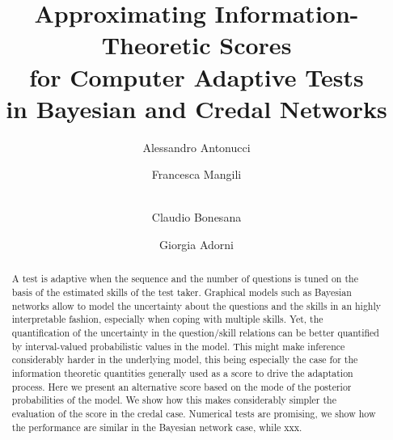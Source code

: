 \documentclass[runningheads]{llncs}
\begin{document}
\title{Approximating Information-Theoretic Scores\\for Computer Adaptive Tests\\in Bayesian and Credal Networks}
\author{Alessandro Antonucci \and
Francesca Mangili \and\\
Claudio Bonesana \and
Giorgia Adorni}
\maketitle
\begin{abstract}
A test is adaptive when the sequence and the number of questions is tuned on the basis of the estimated skills of the test taker. Graphical models such as Bayesian networks allow to model the uncertainty about the questions and the skills in an highly interpretable fashion, especially when coping with multiple skills. Yet, the quantification of the uncertainty in the question/skill relations can be better quantified by interval-valued probabilistic values in the model. This might make inference considerably harder in the underlying model, this being especially the case for the information theoretic quantities generally used as a score to drive the adaptation process.
Here we present an alternative score based on the mode of the posterior probabilities of the model. We show how this makes considerably simpler the evaluation of the score in the credal case. Numerical tests are promising, we show how the performance are similar in the Bayesian network case, while xxx.
\end{abstract}
\end{document}
